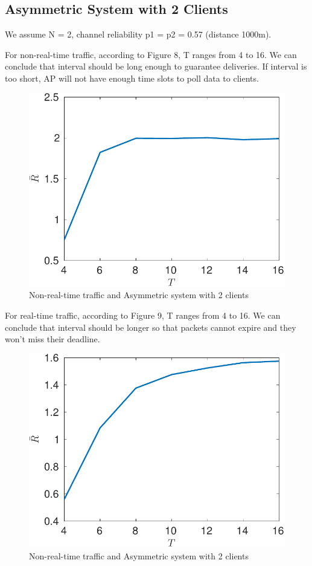 \documentclass{article}
\begin{document}
\subsection{Asymmetric System with 2 Clients}
We assume N = 2, channel reliability p1 = p2 = 0.57 (distance 1000m).

For non-real-time traffic, according to Figure 8, T ranges from 4 to 16. We can conclude that interval should be long enough to guarantee deliveries. If interval is too short, AP will not have enough time slots to poll data to clients. 

\begin{figure}[H]
\centering
\includegraphics[scale=0.7]{nonrealtime_throughput_T.pdf}
\caption{Non-real-time traffic and Asymmetric system with 2 clients}
\end{figure}

For real-time traffic, according to Figure 9, T ranges from 4 to 16. We can conclude that interval should be longer so that packets cannot expire and they won't miss their deadline. 

\begin{figure}[H]
\centering
\includegraphics[scale=0.7]{realtime_throughput_T.pdf}
\caption{Non-real-time traffic and Asymmetric system with 2 clients}
\end{figure}
\end{document}
